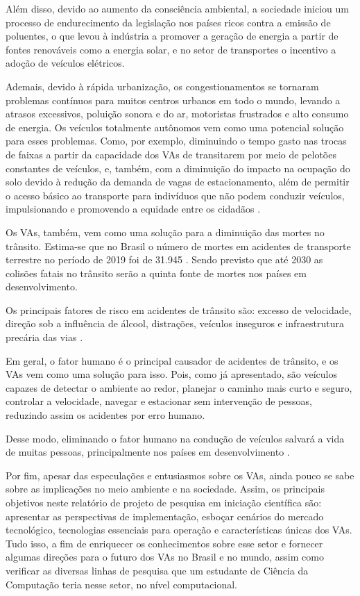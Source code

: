 \documentclass[
	12pt,				%
	openany, %
	a4paper,			%
	english,			%
	french,				%
	spanish,			%
	brazil				%
	]{abntex2}
\begin{document}
Além disso, devido ao aumento da consciência ambiental, a sociedade iniciou um processo de endurecimento da legislação nos países ricos contra a emissão de poluentes, o que levou à indústria a promover a geração de energia a partir de fontes renováveis como a energia solar, e no setor de transportes o incentivo a adoção de veículos elétricos.

Ademais, devido à rápida urbanização, os congestionamentos se tornaram problemas contínuos para muitos centros urbanos em todo o mundo, levando a atrasos excessivos, poluição sonora e do ar, motoristas frustrados e alto consumo de energia. Os veículos totalmente autônomos vem como uma potencial solução para esses problemas. Como, por exemplo, diminuindo o tempo gasto nas trocas de faixas a partir da capacidade dos VAs de transitarem por meio de pelotões constantes de veículos, e, também, com a diminuição do impacto na ocupação do solo devido à redução da demanda de vagas de estacionamento, além de permitir o acesso básico ao transporte para indivíduos que não podem conduzir veículos, impulsionando e promovendo a equidade entre os cidadãos \cite{conge}.

Os VAs, também, vem como uma solução para a diminuição das mortes no trânsito. Estima-se que no Brasil o número de mortes em acidentes de transporte terrestre no período de 2019 foi de 31.945 \cite{Anexo_I_pnatrans}. Sendo previsto que até 2030 as colisões fatais no trânsito serão a quinta fonte de mortes nos países em desenvolvimento. 

Os principais fatores de risco em acidentes de trânsito são: excesso de velocidade, direção sob a influência de álcool, distrações, veículos inseguros e infraestrutura precária das vias \cite{review-auto}.

Em geral, o fator humano é o principal causador de acidentes de trânsito, e os VAs vem como uma solução para isso. Pois, como já apresentado, são veículos capazes de detectar o ambiente ao redor, planejar o caminho mais curto e seguro, controlar a velocidade, navegar e estacionar sem intervenção de pessoas, reduzindo assim os acidentes por erro humano.

Desse modo, eliminando o fator humano na condução de veículos salvará a vida de muitas pessoas, principalmente nos países em desenvolvimento \cite{mundobrasil}. 

Por fim, apesar das especulações e entusiasmos sobre os VAs, ainda pouco se sabe sobre as implicações no meio ambiente e na sociedade. Assim, os principais objetivos neste relatório de projeto de pesquisa em iniciação científica são: apresentar as perspectivas de implementação, esboçar cenários do mercado tecnológico, tecnologias essenciais para operação e características únicas dos VAs. Tudo isso, a fim de enriquecer os conhecimentos sobre esse setor e fornecer algumas direções para o futuro dos VAs no Brasil e no mundo, assim como verificar as diversas linhas de pesquisa que um estudante de Ciência da Computação teria nesse setor, no nível computacional.
\end{document}
